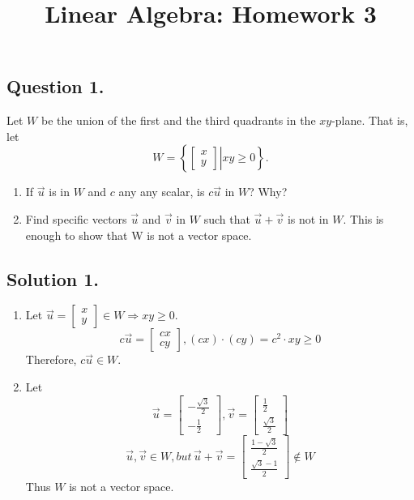 \documentclass{article}
\title{Linear Algebra: Homework 3}
\begin{document}
\maketitle

\subsection*{Question 1.} 
Let $W$ be the union of the first and the third quadrants in the $xy$-plane. That is, let 
\[W=\left\{\left.\left[\begin{array}{cc}x\\y\end{array}\right]\right\rvert xy \geq 0\right\}.\]
\begin{enumerate}
    \item If $\Vec{u}$ is in $W$ and $c$ any any scalar, is $c\Vec{u}$ in $W$? Why?
    \item Find specific vectors $\Vec{u}$ and $\Vec{v}$ in $W$ such that $\Vec{u}+\Vec{v}$ is not in $W$. This is enough to show that W is not a vector space.
\end{enumerate}
\subsection*{Solution 1.}
\begin{enumerate}
    \item Let $\Vec{u}=\left[\begin{array}{cc}x\\y \end{array}\right]\in W \Rightarrow xy \geq 0$.
    \[c\Vec{u}=\left[\begin{array}{cc}cx\\cy\end{array}\right],(cx)\cdot(cy)=c^2\cdot xy \geq 0\]\newline
    Therefore, $c\Vec{u}\in W$.
    \item Let \[\Vec{u}=\left[\begin{array}{cc}-\frac{\sqrt{3}}{2}\\-\frac{1}{2}\end{array}\right], \Vec{v}=\left[\begin{array}{cc}\frac{1}{2}\\ \frac{\sqrt{3}}{2}\end{array}\right]\]
    \[\Vec{u},\vec{v}\in W, but\, \vec{u}+\vec{v}=\left[\begin{array}{cc}\frac{1-\sqrt{3}}{2}\\ \frac{\sqrt{3}-1}{2}\end{array}\right]\notin W\]Thus $W$ is not a vector space.
\end{enumerate}
\end{document}

